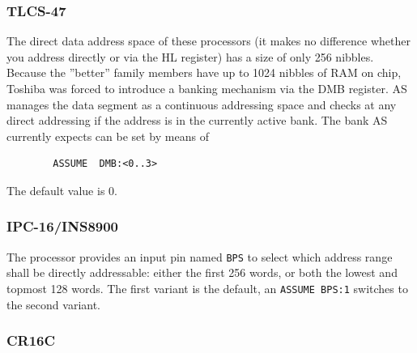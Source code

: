 \documentclass[12pt,twoside]{report}
\newcommand{\asname}{{AS}}
\begin{document}

\subsubsection{TLCS-47}

The direct data address space of these processors (it makes no
difference whether you address directly or via the HL register) has a
size of only 256 nibbles.  Because the ''better'' family members have
up to 1024 nibbles of RAM on chip, Toshiba was forced to introduce a
banking mechanism via the DMB register.  \asname{} manages the data segment
as a continuous addressing space and checks at any direct addressing
if the address is in the currently active bank.  The bank \asname{}
currently expects can be set by means of
\begin{verbatim}
        ASSUME  DMB:<0..3>
\end{verbatim}
The default value is 0.


\subsubsection{IPC-16/INS8900}
\label{PACEAssume}

The processor provides an input pin named {\tt BPS} to select which address
range shall be directly addressable: either the first 256 words, or both
the lowest and topmost 128 words.  The first variant is the default, an
{\tt ASSUME BPS:1} switches to the second variant.


\subsubsection{CR16C}
\end{document}
